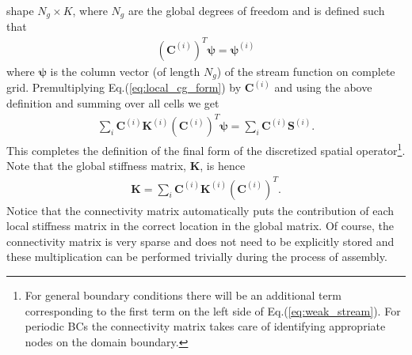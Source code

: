 \documentclass[11pt, reqno]{amsart}
\newcommand{\eqr}[1]{Eq.\thinspace(#1)}
\newcommand{\mvec}[1]{\mathbf{#1}}
\newcommand{\gvec}[1]{\boldsymbol{#1}}
\theoremstyle{definition}
\begin{document}
shape $N_g\times K$, where $N_g$ are the global degrees of freedom and
is defined such that
\begin{align}
  (\mvec{C}^{(i)})^T \gvec{\psi} = \gvec{\psi}^{(i)}
\end{align}
where $\gvec{\psi}$ is the column vector (of length $N_g$) of the
stream function on complete grid. Premultiplying
\eqr{\ref{eq:local_cg_form}} by $\mvec{C}^{(i)}$ and using the above
definition and summing over all cells we get
\begin{align}
  \sum_i
  \mvec{C}^{(i)}
  \mvec{K}^{(i)}
  (\mvec{C}^{(i)})^T
  \gvec{\psi}
  =
  \sum_i
  \mvec{C}^{(i)} \mvec{S}^{(i)}.
\end{align}
This completes the definition of the final form of the discretized
spatial operator\footnote{For general boundary conditions there will
  be an additional term corresponding to the first term on the left
  side of \eqr{\ref{eq:weak_stream}}. For periodic BCs the
  connectivity matrix takes care of identifying appropriate nodes on
  the domain boundary.}. Note that the global stiffness matrix,
$\mvec{K}$, is hence
\begin{align}
  \mvec{K}
  =
  \sum_i
  \mvec{C}^{(i)}
  \mvec{K}^{(i)}
  (\mvec{C}^{(i)})^T.
\end{align}
Notice that the connectivity matrix automatically puts the
contribution of each local stiffness matrix in the correct location in
the global matrix. Of course, the connectivity matrix is very sparse
and does not need to be explicitly stored and these multiplication can
be performed trivially during the process of assembly.
\end{document}
